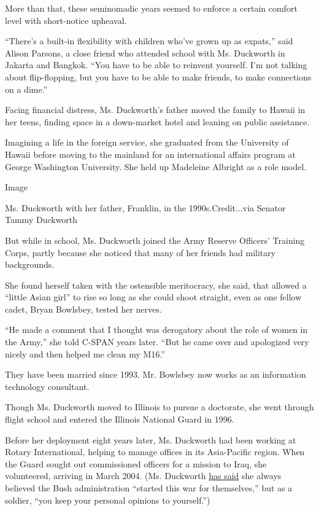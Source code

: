 More than that, these seminomadic years seemed to enforce a certain
comfort level with short-notice upheaval.

``There's a built-in flexibility with children who've grown up as
expats,'' said Alison Parsons, a close friend who attended school with
Ms. Duckworth in Jakarta and Bangkok. ``You have to be able to reinvent
yourself. I'm not talking about flip-flopping, but you have to be able
to make friends, to make connections on a dime.''

Facing financial distress, Ms. Duckworth's father moved the family to
Hawaii in her teens, finding space in a down-market hotel and leaning on
public assistance.

Imagining a life in the foreign service, she graduated from the
University of Hawaii before moving to the mainland for an international
affairs program at George Washington University. She held up Madeleine
Albright as a role model.

Image

Ms. Duckworth with her father, Franklin, in the 1990s.Credit...via
Senator Tammy Duckworth

But while in school, Ms. Duckworth joined the Army Reserve Officers'
Training Corps, partly because she noticed that many of her friends had
military backgrounds.

She found herself taken with the ostensible meritocracy, she said, that
allowed a ``little Asian girl'' to rise so long as she could shoot
straight, even as one fellow cadet, Bryan Bowlsbey, tested her nerves.

``He made a comment that I thought was derogatory about the role of
women in the Army,'' she told C-SPAN years later. ``But he came over and
apologized very nicely and then helped me clean my M16.''

They have been married since 1993. Mr. Bowlsbey now works as an
information technology consultant.

Though Ms. Duckworth moved to Illinois to pursue a doctorate, she went
through flight school and entered the Illinois National Guard in 1996.

Before her deployment eight years later, Ms. Duckworth had been working
at Rotary International, helping to manage offices in its Asia-Pacific
region. When the Guard sought out commissioned officers for a mission to
Iraq, she volunteered, arriving in March 2004. (Ms. Duckworth
\href{https://www.wbez.org/stories/ep-106-sen-tammy-duckworth/aa3e6284-2b53-44e5-9312-83e82aef723a}{has
said} she always believed the Bush administration ``started this war for
themselves,'' but as a soldier, ``you keep your personal opinions to
yourself.'')

